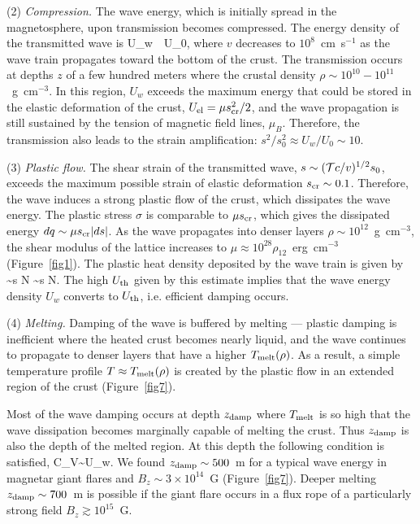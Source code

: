 (2) {\it Compression.}
The wave energy, which is initially spread in the magnetosphere, upon transmission becomes compressed. The energy density of the transmitted wave is
\beq 
   U_w\approx \T\,  \, U_0, 
\eeq
where $v$ decreases to $10^8$~cm~s$^{-1}$ as the wave train propagates toward the bottom of the crust. The transmission occurs at depths $z$ of a few hundred meters where the crustal density $\rho\sim 10^{10}-10^{11}$~g~cm$^{-3}$. 
In this region, $U_w$ exceeds the maximum energy that could be stored in the elastic deformation of the crust, $U_{\rm el}=\mu s_{\rm cr}^2/2$, and the wave propagation is still sustained by the tension of magnetic field lines, $\mu_B$. 
Therefore, the transmission also leads to the strain amplification: $s^2/s_0^2\approx U_w/U_0\sim 10$.

(3) {\it Plastic flow.}
The shear strain of the transmitted wave, $s\sim ({\mathcal T} c/v)^{1/2} s_0$, exceeds the maximum possible strain of elastic deformation $s_{\rm cr}\sim 0.1$. 
Therefore, the wave induces a strong plastic flow of the crust, which dissipates the wave energy. 
The plastic stress $\sigma$ is comparable to $\mu s_{\rm cr}$, which gives the dissipated energy $dq\sim \mu s_{\rm cr} |ds|$.
As the wave propagates into denser layers $\rho\sim 10^{12}$~g~cm$^{-3}$, the shear modulus of the lattice increases to $\mu\approx 10^{28}\rho_{12}$~erg~cm$^{-3}$ (Figure~\ref{fig1}).
The plastic heat density deposited by the wave train is given by
\beq
   \Uth \sim \sigma s N \sim \mu \scr s N.
\eeq  
The high $U_{\rm th}$ given by this estimate implies that the wave energy density $U_w$ converts to $U_{\rm th}$, i.e. efficient damping occurs.

(4) {\it Melting.}
Damping of the wave is buffered by melting --- plastic damping is inefficient where the heated crust becomes nearly liquid, and the wave continues to propagate to denser layers that have a higher $T_{\rm melt}(\rho)$. 
As a result, a simple temperature profile $T\approx T_{\rm melt}(\rho)$ is created by the plastic flow in an extended region of the crust (Figure~\ref{fig7}). 

Most of the wave damping occurs at depth $z_{\rm damp}$ where $T_{\rm melt}$ is so high that the wave dissipation becomes marginally capable of melting the crust. 
Thus $z_{\rm damp}$ is also the depth of the melted region. At this depth the following condition is satisfied,
\beq
   C_V\Tm\sim U_w.
\eeq
We found $z_{\rm damp}\sim 500$~m for a typical wave energy in magnetar giant flares and $B_z\sim 3\times 10^{14}$~G (Figure~\ref{fig7}). Deeper melting $z_{\rm damp}\sim 700$~m is possible if the giant flare occurs in a flux rope of a particularly strong field $B_z\gtrsim 10^{15}$~G.

